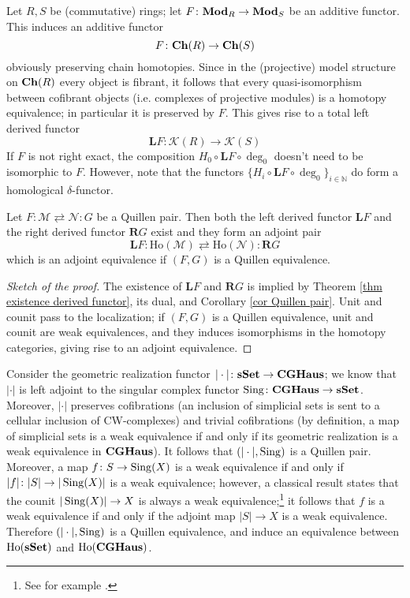 \begin{refsection}
\begin{eg}
Let $R, S$ be (commutative) rings; let $F \colon \mathbf{Mod}_R \to \mathbf{Mod}_S$ be an additive functor. This induces an additive functor
\[
F \colon \mathbf{Ch}(R) \to \mathbf{Ch}(S)
\]
obviously preserving chain homotopies. Since in the (projective) model structure on $\mathbf{Ch}(R)$ every object is fibrant, it follows that every quasi-isomorphism between cofibrant objects (i.e. complexes of projective modules) is a homotopy equivalence; in particular it is preserved by $F$. This gives rise to a total left derived functor
\[
\mathbf L F \colon \mathcal K(R) \to \mathcal K(S)
\]
If $F$ is not right exact, the composition $H_0 \circ \mathbf L F \circ \deg_0$ doesn't need to be isomorphic to $F$. However, note that the functors $\{H_i \circ \mathbf LF \circ \deg_0\}_{i \in \mathbb N}$ do form a homological $\delta$-functor.
\end{eg}

\begin{thm} \label{thm quillen adjuntion}
Let $F \colon \mathcal M \rightleftarrows \mathcal N \colon G$ be a Quillen pair. Then both the left derived functor $\mathbf L F$ and the right derived functor $\mathbf R G$ exist and they form an adjoint pair
\[
\mathbf L F \colon \mathrm{Ho}(\mathcal M) \rightleftarrows \mathrm{Ho}(\mathcal N) \colon \mathbf R G
\]
which is an adjoint equivalence if $(F,G)$ is a Quillen equivalence.
\end{thm}

\begin{proof}[Sketch of the proof]
The existence of $\mathbf L F$ and $\mathbf R G$ is implied by Theorem \ref{thm existence derived functor}, its dual, and Corollary \ref{cor Quillen pair}. Unit and counit pass to the localization; if $(F,G)$ is a Quillen equivalence, unit and counit are weak equivalences, and they induces isomorphisms in the homotopy categories, giving rise to an adjoint equivalence.
\end{proof}

\begin{eg}
Consider the geometric realization functor $|\cdot| \colon \mathbf{s\,\!\mathbf{Set}} \to \mathbf{CGHaus}$; we know that $|\cdot|$ is left adjoint to the singular complex functor $\operatorname{\mathrm{Sing}} \colon \mathbf{CGHaus} \to \mathbf{s\,\!\mathbf{Set}}$. Moreover, $|\cdot|$ preserves cofibrations (an inclusion of simplicial sets is sent to a cellular inclusion of CW-complexes) and trivial cofibrations (by definition, a map of simplicial sets is a weak equivalence if and only if its geometric realization is a weak equivalence in $\mathbf{CGHaus}$). It follows that $(|\cdot|,\operatorname{\mathrm{Sing}})$ is a Quillen pair. Moreover, a map $f \colon S \to \operatorname{\mathrm{Sing}}(X)$ is a weak equivalence if and only if $|f| \colon |S| \to |\operatorname{\mathrm{Sing}}(X)|$ is a weak equivalence; however, a classical result states that the counit $|\operatorname{\mathrm{Sing}}(X)| \to X$ is always a weak equivalence;\footnote{See for example \cite[Theorem 16.6]{may}.} it follows that $f$ is a weak equivalence if and only if the adjoint map $|S| \to X$ is a weak equivalence. Therefore $(|\cdot|,\operatorname{\mathrm{Sing}})$ is a Quillen equivalence, and induce an equivalence between $\mathrm{Ho}(\mathbf{s\,\!\mathbf{Set}})$ and $\mathrm{Ho}(\mathbf{CGHaus})$.
\end{eg}


\end{refsection}
